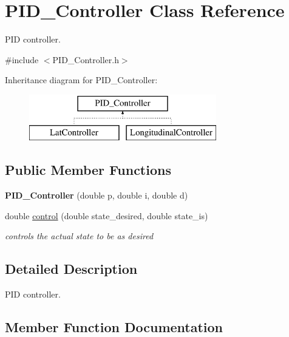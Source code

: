 \hypertarget{class_p_i_d___controller}{}\section{P\+I\+D\+\_\+\+Controller Class Reference}
\label{class_p_i_d___controller}


P\+ID controller.  




{\ttfamily \#include $<$P\+I\+D\+\_\+\+Controller.\+h$>$}

Inheritance diagram for P\+I\+D\+\_\+\+Controller\+:\begin{figure}[H]
\begin{center}
\leavevmode
\includegraphics[height=2.000000cm]{class_p_i_d___controller}
\end{center}
\end{figure}
\subsection*{Public Member Functions}
\begin{DoxyCompactItemize}
\item 
\mbox{\label{class_p_i_d___controller_ab69b1ea3eb1fc71248e1cc2967919197}} 
{\bfseries P\+I\+D\+\_\+\+Controller} (double p, double i, double d)
\item 
double \mbox{\hyperlink{class_p_i_d___controller_aea34b244e81b73af225ea8e3721c74d8}{control}} (double state\+\_\+desired, double state\+\_\+is)
\begin{DoxyCompactList}\small\item\em controls the actual state to be as desired \end{DoxyCompactList}\end{DoxyCompactItemize}


\subsection{Detailed Description}
P\+ID controller. 

\subsection{Member Function Documentation}
\mbox{\label{class_p_i_d___controller_aea34b244e81b73af225ea8e3721c74d8}} 
